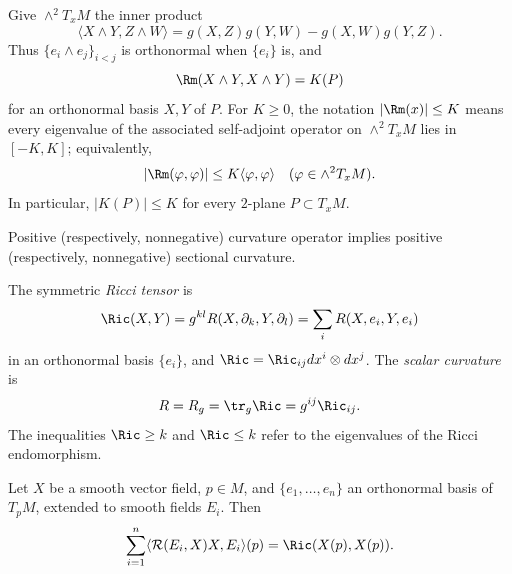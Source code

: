 \begin{definition}
\label{def:curvature-operator-norm}
\leanok



Give $\wedge^2T_xM$ the inner product
\[
  \langle X\wedge Y,Z\wedge W\rangle
  =g(X,Z)g(Y,W)-g(X,W)g(Y,Z).
\]
Thus $\{e_i\wedge e_j\}_{i<j}$ is orthonormal when $\{e_i\}$ is, and
\[
  \Rm(X\wedge Y,X\wedge Y)=K(P)
\]
for an orthonormal basis $X,Y$ of $P$. For $K\ge0$, the notation
$|\Rm(x)|\le K$ means every eigenvalue of the associated self-adjoint
operator on $\wedge^2T_xM$ lies in $[-K,K]$; equivalently,
\[
  |\Rm(\varphi,\varphi)|\le K\langle\varphi,\varphi\rangle
  \quad(\varphi\in\wedge^2T_xM).
\]
In particular, $|K(P)|\le K$ for every $2$-plane $P\subset T_xM$.
\end{definition}

Positive (respectively, nonnegative) curvature operator implies positive
(respectively, nonnegative) sectional curvature.


\begin{definition}
\label{def:ricci-curvature}
\leanok



The symmetric \emph{Ricci tensor} is
\[
  \Ric(X,Y)=g^{kl}R(X,\partial_k,Y,\partial_l)
  =\sum_iR(X,e_i,Y,e_i)
\]
in an orthonormal basis $\{e_i\}$, and
$\Ric=\Ric_{ij}dx^i\otimes dx^j$. The \emph{scalar curvature} is
\[
  R=R_g=\tr_g\Ric=g^{ij}\Ric_{ij}.
\]
The inequalities $\Ric\ge k$ and $\Ric\le k$ refer to the eigenvalues
of the Ricci endomorphism.
\end{definition}

\begin{lemma}
\label{lem:ricci-trace-curvature-operator}



Let $X$ be a smooth vector field, $p\in M$, and
$\{e_1,\ldots,e_n\}$ an orthonormal basis of $T_pM$, extended to
smooth fields $E_i$. Then
\[
  \sum_{i=1}^n\langle\mathcal R(E_i,X)X,E_i\rangle(p)
  =\Ric(X(p),X(p)).
\]
\end{lemma}

